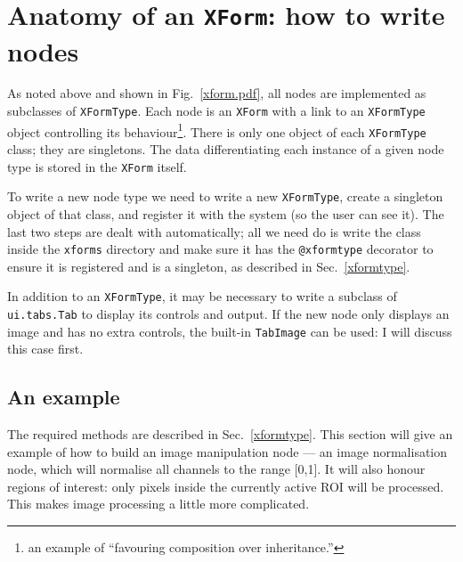 

\section{Anatomy of an \texttt{XForm}: how to write nodes}
\label{writingnodes}
As noted above and shown in Fig.~\ref{xform.pdf}, all nodes are 
implemented as subclasses of \texttt{XFormType}. Each node 
is an \texttt{XForm} with a link to an \texttt{XFormType} object
controlling its behaviour\footnote{an example of ``favouring
composition over inheritance.''}.
There is only one object of each \texttt{XFormType} class; they
are singletons. The data differentiating each instance of 
a given node type is stored in the \texttt{XForm} itself.

To write a new node type we need to write a new \texttt{XFormType},
create a singleton object of that class, and register it with the system
(so the user can see it). The last two steps are dealt with automatically;
all we need do is write the class inside the \texttt{xforms} directory
and make sure it has the \texttt{@xformtype} decorator to ensure
it is registered and is a singleton, as described in 
Sec.~\ref{xformtype}.

In addition to an \texttt{XFormType}, it may be necessary to write
a subclass of \texttt{ui.tabs.Tab} to display its controls and output.
If the new node only displays
an image and has no extra controls, the built-in \texttt{TabImage}
can be used: I will discuss this case first.

\subsection{An example}
The required methods are described in Sec.~\ref{xformtype}. This
section will give an example of how to build an image manipulation
node --- an image normalisation node, which will normalise all channels
to the range [0,1]. It will also honour regions of interest:
only pixels inside the currently active ROI will be processed. This makes
image processing a little more complicated.

